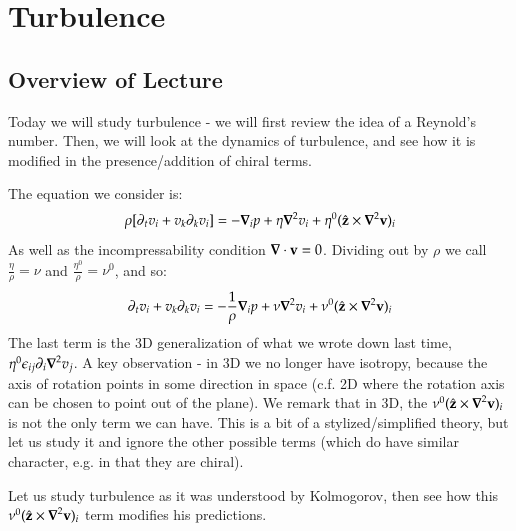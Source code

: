 \section{Turbulence}

\subsection{Overview of Lecture}
Today we will study turbulence - we will first review the idea of a Reynold's number. Then, we will look at the dynamics of turbulence, and see how it is modified in the presence/addition of chiral terms.

The equation we consider is:
\begin{equation}
    \rho[\p_t v_i + v_k \p_k v_i] = - \nabla_i p + \eta \nabla^2 v_i + \eta^0 (\hat{\v{z}} \times \nabla^2 \v{v})_i
\end{equation}
As well as the incompressability condition $\nabla \cdot \v{v} = 0$. Dividing out by $\rho$ we call $\frac{\eta}{\rho} = \nu$ and $\frac{\eta^0}{\rho} = \nu^0$, and so:
\begin{equation}
    \p_t v_i + v_k \p_k v_i = - \frac{1}{\rho}\nabla_i p + \nu \nabla^2 v_i + \nu^0 (\hat{\v{z}} \times \nabla^2 \v{v})_i
\end{equation}
The last term is the 3D generalization of what we wrote down last time, $\eta^0\e_{ij}\p_i \nabla^2v_j$. A key observation - in 3D we no longer have isotropy, because the axis of rotation points in some direction in space (c.f. 2D where the rotation axis can be chosen to point out of the plane). We remark that in 3D, the $\nu^0 (\hat{\v{z}} \times \nabla^2 \v{v})_i$ is not the only term we can have. This is a bit of a stylized/simplified theory, but let us study it and ignore the other possible terms (which do have similar character, e.g. in that they are chiral).

Let us study turbulence as it was understood by Kolmogorov, then see how this $\nu^0 (\hat{\v{z}} \times \nabla^2 \v{v})_i$ term modifies his predictions.


